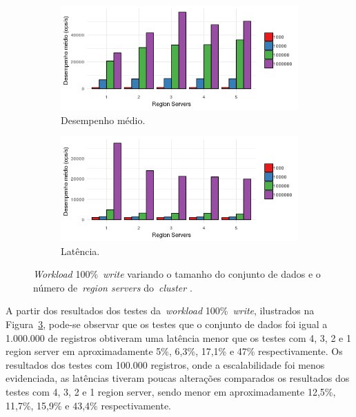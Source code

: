 \documentclass[12pt]{article}
\begin{document}
\begin{figure}[!ht]
    \centering
    \begin{subfigure}[b]{0.49\textwidth}
        \centering
        \includegraphics[width=\textwidth]{images/figura15}
        \caption{Desempenho médio.}
        \label{figura15}
    \end{subfigure}
        \hfill
    \begin{subfigure}[b]{0.49\textwidth}  
        \centering 
        \includegraphics[width=\textwidth]{images/figura16}
        \caption{Latência.}
        \label{figura16}
    \end{subfigure}
    \caption{\emph{Workload} 100\%~\emph{write} variando o tamanho do conjunto de dados e o número de~\emph{region servers} do~\emph{cluster} .}
\end{figure}

A partir dos resultados dos testes da~\emph{workload} 100\%~\emph{write}, ilustrados na Figura~\ref{figura16}, pode-se observar que os testes que o conjunto de dados foi igual a 1.000.000 de registros obtiveram uma latência menor que os testes com 4, 3, 2 e 1 region server em aproximadamente 5\%, 6,3\%, 17,1\% e 47\% respectivamente. Os resultados dos testes com 100.000 registros, onde a escalabilidade foi menos evidenciada, as latências tiveram poucas alterações comparados os resultados dos testes com 4, 3, 2 e 1 region server, sendo menor em aproximadamente 12,5\%, 11,7\%, 15,9\% e 43,4\% respectivamente.
\end{document}
